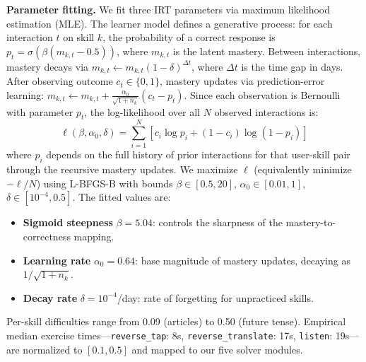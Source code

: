 \documentclass{article}
\begin{document}
\textbf{Parameter fitting.} We fit three IRT parameters via maximum likelihood estimation (MLE). The learner model defines a generative process: for each interaction $t$ on skill $k$, the probability of a correct response is $p_t = \sigma(\beta(m_{k,t} - 0.5))$, where $m_{k,t}$ is the latent mastery. Between interactions, mastery decays via $m_{k,t} \leftarrow m_{k,t}(1-\delta)^{\Delta t}$, where $\Delta t$ is the time gap in days. After observing outcome $c_t \in \{0,1\}$, mastery updates via prediction-error learning: $m_{k,t} \leftarrow m_{k,t} + \frac{\alpha_0}{\sqrt{1+n_k}}(c_t - p_t)$. Since each observation is Bernoulli with parameter $p_t$, the log-likelihood over all $N$ observed interactions is:
\begin{equation}
\ell(\beta, \alpha_0, \delta) = \sum_{i=1}^{N} \left[ c_i \log p_i + (1 - c_i) \log(1 - p_i) \right]
\end{equation}
where $p_i$ depends on the full history of prior interactions for that user-skill pair through the recursive mastery updates. We maximize $\ell$ (equivalently minimize $-\ell/N$) using L-BFGS-B \citep{scipy} with bounds $\beta \in [0.5, 20]$, $\alpha_0 \in [0.01, 1]$, $\delta \in [10^{-4}, 0.5]$. The fitted values are:
\begin{itemize}
    \item \textbf{Sigmoid steepness} $\beta = 5.04$: controls the sharpness of the mastery-to-correctness mapping.
    \item \textbf{Learning rate} $\alpha_0 = 0.64$: base magnitude of mastery updates, decaying as $1/\sqrt{1+n_k}$.
    \item \textbf{Decay rate} $\delta = 10^{-4}$/day: rate of forgetting for unpracticed skills.
\end{itemize}
Per-skill difficulties range from 0.09 (articles) to 0.50 (future tense). Empirical median exercise times---\texttt{reverse\_tap}: 8s, \texttt{reverse\_translate}: 17s, \texttt{listen}: 19s---are normalized to $[0.1, 0.5]$ and mapped to our five solver modules.
\end{document}
